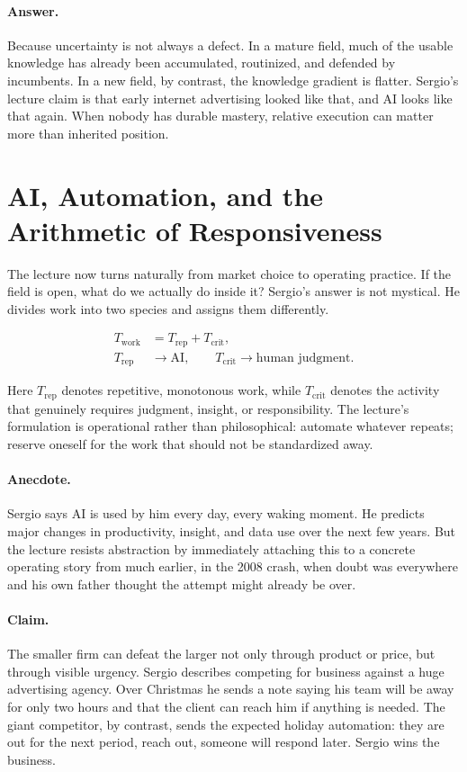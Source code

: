 \paragraph{Answer.}
Because uncertainty is not always a defect. In a mature field, much of the usable knowledge has already been accumulated, routinized, and defended by incumbents. In a new field, by contrast, the knowledge gradient is flatter. Sergio's lecture claim is that early internet advertising looked like that, and AI looks like that again. When nobody has durable mastery, relative execution can matter more than inherited position.

\section{AI, Automation, and the Arithmetic of Responsiveness}

The lecture now turns naturally from market choice to operating practice. If the field is open, what do we actually do inside it? Sergio's answer is not mystical. He divides work into two species and assigns them differently.

\begin{align}
T_{\mathrm{work}} &= T_{\mathrm{rep}} + T_{\mathrm{crit}},\\
T_{\mathrm{rep}} &\to \mathrm{AI}, \qquad T_{\mathrm{crit}} \to \text{human judgment}.
\end{align}

Here \(T_{\mathrm{rep}}\) denotes repetitive, monotonous work, while \(T_{\mathrm{crit}}\) denotes the activity that genuinely requires judgment, insight, or responsibility. The lecture's formulation is operational rather than philosophical: automate whatever repeats; reserve oneself for the work that should not be standardized away.

\paragraph{Anecdote.}
Sergio says AI is used by him every day, every waking moment. He predicts major changes in productivity, insight, and data use over the next few years. But the lecture resists abstraction by immediately attaching this to a concrete operating story from much earlier, in the 2008 crash, when doubt was everywhere and his own father thought the attempt might already be over.

\paragraph{Claim.}
The smaller firm can defeat the larger not only through product or price, but through visible urgency. Sergio describes competing for business against a huge advertising agency. Over Christmas he sends a note saying his team will be away for only two hours and that the client can reach him if anything is needed. The giant competitor, by contrast, sends the expected holiday automation: they are out for the next period, reach out, someone will respond later. Sergio wins the business.

